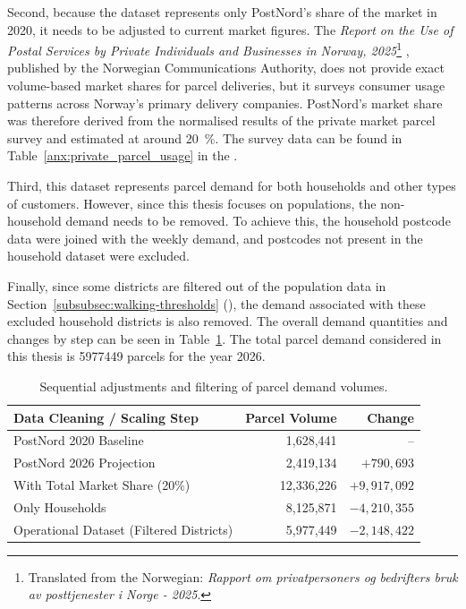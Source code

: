 \documentclass[12pt]{article}
\begin{document}
Second, because the dataset represents only PostNord's share of the market in 2020, it needs to be adjusted to current market figures. The \textit{Report on the Use of Postal Services by Private Individuals and Businesses in Norway, 2025}\footnote{Translated from the Norwegian: \textit{Rapport om privatpersoners og bedrifters bruk av posttjenester i Norge - 2025}.} \parencite{nkom_post_2025}, published by the Norwegian Communications Authority, does not provide exact volume-based market shares for parcel deliveries, but it surveys consumer usage patterns across Norway's primary delivery companies. PostNord's market share was therefore derived from the normalised results of the private market parcel survey and estimated at around \qty{20}{\percent}. The survey data can be found in Table~\ref{anx:private_parcel_usage} in the .

Third, this dataset represents parcel demand for both households and other types of customers. However, since this thesis focuses on populations, the non-household demand needs to be removed. To achieve this, the household postcode data were joined with the weekly demand, and postcodes not present in the household dataset were excluded.

Finally, since some districts are filtered out of the population data in Section~\ref{subsubsec:walking-thresholds} (), the demand associated with these excluded household districts is also removed. The overall demand quantities and changes by step can be seen in Table~\ref{tab:parcel_volumes}. The total parcel demand considered in this thesis is \num{5977449} parcels for the year 2026.

\begin{table}[htbp]
  \centering
  \caption{Sequential adjustments and filtering of parcel demand volumes.}
  \label{tab:parcel_volumes}
  \begin{tabular}{lrr}
    \toprule
    \textbf{Data Cleaning / Scaling Step}    & \textbf{Parcel Volume} & \textbf{Change} \\
    \midrule
    PostNord 2020 Baseline                   & 1,628,441              & --              \\
    PostNord 2026 Projection                 & 2,419,134              & \(+790,693\)    \\
    With Total Market Share (20\%)           & 12,336,226             & \(+9,917,092\)  \\
    Only Households                          & 8,125,871              & \(-4,210,355\)  \\
    Operational Dataset (Filtered Districts) & 5,977,449              & \(-2,148,422\)  \\
    \bottomrule
  \end{tabular}
\end{table}
\end{document}
